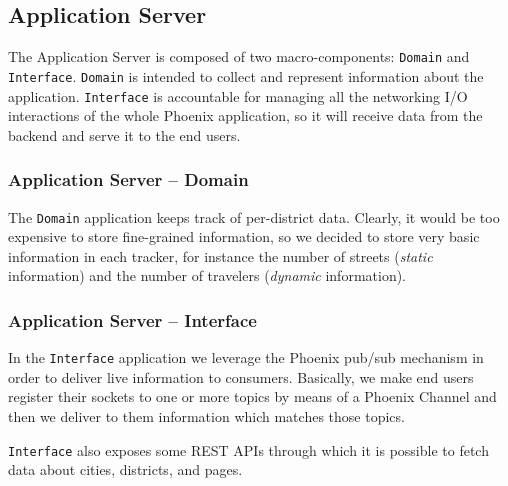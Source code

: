 \subsection{Application Server}\label{sec:sol-des-as}

The Application Server is composed of two macro-components: \texttt{Domain}
and \texttt{Interface}.
\texttt{Domain} is intended to collect and represent information about the
application.
\texttt{Interface} is accountable for managing all the networking I/O
interactions of the whole Phoenix application, so it will receive data from the
backend and serve it to the end users.

\subsubsection{Application Server -- Domain}

The \texttt{Domain} application keeps track of per-district data.
Clearly, it would be too expensive to store fine-grained information, so we
decided to store very basic information in each tracker, for instance the
number of streets (\textit{static} information) and the number of travelers
(\textit{dynamic} information).

\subsubsection{Application Server -- Interface}
In the \texttt{Interface} application we leverage the Phoenix pub/sub
mechanism in order to deliver live information to consumers.
Basically, we make end users register their sockets to one or more topics by
means of a Phoenix Channel and then we deliver to them information which
matches those topics.

\texttt{Interface} also exposes some REST APIs through which it is possible to
fetch data about cities, districts, and pages.
